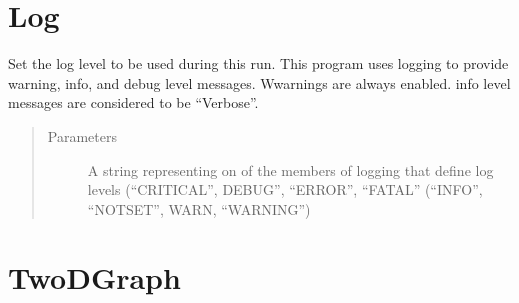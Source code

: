 \documentclass[letterpaper,10pt,english]{sphinxmanual}
\begin{document}
\section{Log}
\label{\detokenize{index:module-log}}\label{\detokenize{index:log}}

\begin{fulllineitems}
\label{\detokenize{index:log.setLog}}
Set the log level to be used during this run.
This program uses logging to provide warning, info, and debug
level messages. Wwarnings are always enabled.  info level messages
are considered to be “Verbose”.
\begin{quote}\begin{description}
\item[{Parameters}] \leavevmode
{} \textendash{} A string representing on of the members of logging that
define log levels (“CRITICAL”, DEBUG”, “ERROR”, “FATAL”
(“INFO”, “NOTSET”, WARN, “WARNING”)

\end{description}\end{quote}

\end{fulllineitems}



\section{TwoDGraph}
\label{\detokenize{index:module-TwoDGraph}}\label{\detokenize{index:twodgraph}}
\end{document}
